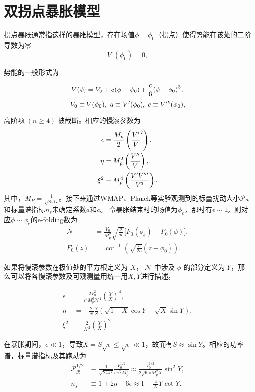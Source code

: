 \section{双拐点暴胀模型}
拐点暴胀通常指这样的暴胀模型，存在场值$\phi=\phi_0$（拐点）使得势能在该处的二阶导数为零
\begin{equation}
    V^{\dprime}(\phi_0) = 0,
\end{equation}

势能的一般形式为

\begin{equation}
    \label{eq:inf_potential}
    V (\phi)=V_0+a (\phi-\phi_0)+\frac{c}{6}{\left(\phi-\phi_0\right)}^3,\\
\end{equation}
\begin{equation}
    V_0\equiv V (\phi_0),\ a\equiv V' (\phi_0),\ c\equiv V^{\tprime}
    (\phi_0),
\end{equation}

高阶项 $(n \geq 4)$ 被截断。相应的慢滚参数为
\begin{align}
    \label{eq:psrp}
    \epsilon &= \frac{M_p}{2}\left(\frac{V'}{V}^2\right),\\
    \eta&=M^2_p
    \left(\frac{V^{\prime\prime}}{V}\right),\\
    \xi^2&=M^4_p\left(\frac{V'V^{\prime\prime\prime}}{V^2}\right).
\end{align}
其中，$M_P=\frac{1}{\sqrt{8\pi
G}}$。接下来通过WMAP、Planck等实验观测到的标量扰动大小$\mathcal{P}_{\mathcal{R}}$和标量谱指标$n_s$来确定系数$a$和$c$。
令暴胀结束时的场值为$\phi_e$，那时有$\epsilon\sim
1$。则对应$\phi\sim\phi_e$的e-folding数为
\begin{align}
    \label{eq:e-folding}
    \mathcal{N} &= \frac{V_0}{M^2_p}\sqrt{\frac{2}{ac}}\lbrack
    F_0(\phi_e)-F_0(\phi)\rbrack, \\
    F_0(z) &= \cot^{-1}\left(\sqrt{\frac{c}{2a}}(z-\phi_0)\right).
\end{align}

如果将慢滚参数在极值处的平方根定义为 $X$， $\mathcal{N}$ 中涉及 $\phi$
的部分定义为 $Y$，那么可以将各慢滚参数及可观测量用统一用$X,Y$进行描述。

\begin{align}
    \epsilon &=
    \frac{2V_0^2}{c^2M_p^6\mathcal{N}^4} {\left(\frac{Y}{X} \right)}^4, \\
    \eta &=
    -\frac{2}{\mathcal{N}}\frac{Y}{S}\left(\sqrt{1-X}\cos Y-\sqrt{X}\sin
    Y\right),\\
    \xi^2 &= \frac{2}{\mathcal{N}^2}{\left(\frac{Y}{X}\right)}^2.
\end{align}

在暴胀期间，$\epsilon \ll 1$，导致$X=S\sqrt{\epsilon}\leq\sqrt{\epsilon}\ll
1$，故而有$S\approx \sin Y$。相应的功率谱，标量谱指标及其跑动为
\begin{align}
  \mathcal{P}_{\mathcal{R}}^{1/2}&\equiv\frac{1}{\sqrt{24\pi^2}}\frac{V_0^{1/2}}{\epsilon^{1/2}M_p^2}
    \approx\frac{V_0^{1/2}}{2\sqrt{6}\pi M_p^2 X}\sin^2Y,\\
    n_s&\equiv1+2\eta-6\epsilon\approx1-\frac{4}{\mathcal{N}}Y\cot Y.
\end{align}
